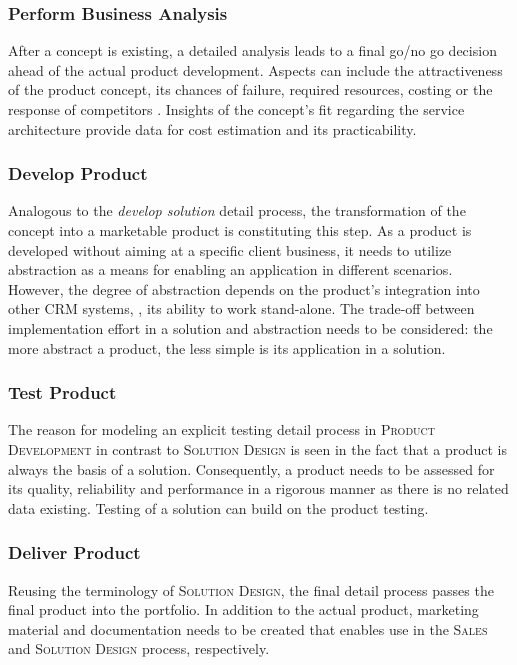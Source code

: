 	\subsubsection{Perform Business Analysis}
	After a concept is existing, a detailed analysis leads to a final go/no go decision ahead of the actual product development. Aspects can include the attractiveness of the product concept, its chances of failure, required resources, costing or the response of competitors \citep[]{cowell1988new}. Insights of the concept's fit regarding the service architecture provide data for cost estimation and its practicability.  
	
	\subsubsection{Develop Product}
	Analogous to the \textit{develop solution} detail process, the transformation of the concept into a marketable product is constituting this step. As a product is developed without aiming at a specific client business, it needs to utilize abstraction as a means for enabling an application in different scenarios. However, the degree of abstraction depends on the product's integration into other \acrshort{CRM} systems, \ie, its ability to work stand-alone. The trade-off between implementation effort in a solution and abstraction needs to be considered: the more abstract a product, the less simple is its application in a solution. 
	
	\subsubsection{Test Product}
	The reason for modeling an explicit testing detail process in \textsc{Product Development} in contrast to \textsc{Solution Design} is seen in the fact that a product is always the basis of a solution. Consequently, a product needs to be assessed for its quality, reliability and performance in a rigorous manner as there is no related data existing. Testing of a solution can build on the product testing. 
	
	\subsubsection{Deliver Product}
	Reusing the terminology of \textsc{Solution Design}, the final detail process passes the final product into the portfolio. In addition to the actual product, marketing material and documentation needs to be created that enables use in the \textsc{Sales} and \textsc{Solution Design} process, respectively. 
	
